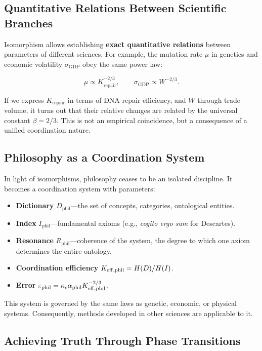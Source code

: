\documentclass[12pt,a4paper]{article}
\newcommand{\kappac}{\kappa_c}
\newcommand{\eps}{\varepsilon}
\newcommand{\betaf}{\beta}
\begin{document}
	\subsection{Quantitative Relations Between Scientific Branches}
	
	Isomorphism allows establishing \textbf{exact quantitative relations} between parameters of different sciences. For example, the mutation rate \(\mu\) in genetics and economic volatility \(\sigma_{\mathrm{GDP}}\) obey the same power law:
	
	\[
	\mu \propto K_{\mathrm{repair}}^{-2/3}, \qquad \sigma_{\mathrm{GDP}} \propto W^{-2/3}.
	\]
	
	If we express \(K_{\mathrm{repair}}\) in terms of DNA repair efficiency, and \(W\) through trade volume, it turns out that their relative changes are related by the universal constant \(\betaf = 2/3\). This is not an empirical coincidence, but a consequence of a unified coordination nature.
	
	\subsection{Philosophy as a Coordination System}
	
	In light of isomorphisms, philosophy ceases to be an isolated discipline. It becomes a coordination system with parameters:
	
	\begin{itemize}
		\item \textbf{Dictionary} \(D_{\text{phil}}\)—the set of concepts, categories, ontological entities.
		\item \textbf{Index} \(I_{\text{phil}}\)—fundamental axioms (e.g., \textit{cogito ergo sum} for Descartes).
		\item \textbf{Resonance} \(R_{\text{phil}}\)—coherence of the system, the degree to which one axiom determines the entire ontology.
		\item \textbf{Coordination efficiency} \(\Keff[\text{phil}] = H(D)/H(I)\).
		\item \textbf{Error} \(\eps_{\text{phil}} = \kappac \alpha_{\text{phil}} \Keff[\text{phil}]^{-2/3}\).
	\end{itemize}
	
	This system is governed by the same laws as genetic, economic, or physical systems. Consequently, methods developed in other sciences are applicable to it.
	
	\subsection{Achieving Truth Through Phase Transitions}
	
\end{document}

